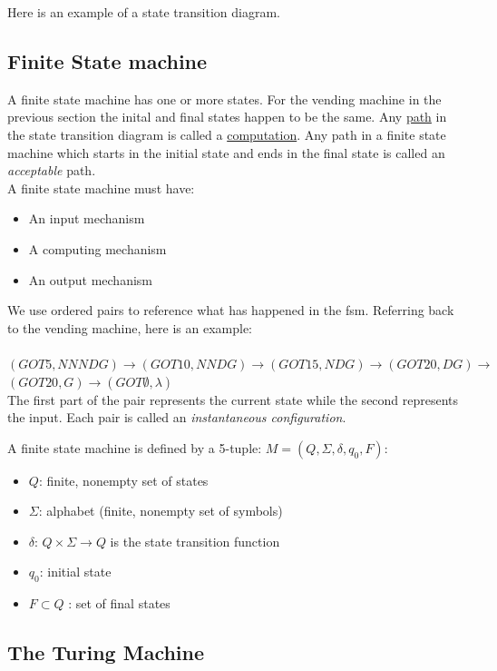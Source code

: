 \documentclass{scrartcl}
\begin{document}
Here is an example of a state transition diagram.

\subsection{Finite State machine}
A finite state machine has one or more states. For the vending machine in the previous section the inital and final states happen to be the same. Any \underline{path} in the state transition diagram is called a \underline{computation}. Any path in a finite state machine which starts in the initial state and ends in the final state is called an \emph{acceptable} path.\\

A finite state machine must have:
\begin{itemize}
\item An input mechanism
\item A computing mechanism
\item An output mechanism
\end{itemize}

We use ordered pairs to reference what has happened in the fsm. Referring back to the vending machine, here is an example:\\\\
$(GOT5,NNNDG)\rightarrow(GOT10,NNDG)\rightarrow(GOT15,NDG)\rightarrow(GOT20,DG)\rightarrow$\\
$(GOT20,G)\rightarrow(GOT\emptyset,\lambda)$\\

The first part of the pair represents the current state while the second represents the input. Each pair is called an \emph{instantaneous configuration}.

A finite state machine is defined by a 5-tuple: $M=(Q,\Sigma,\delta,q_0,F)$:
\begin{itemize}
\item $Q$: finite, nonempty set of states
\item $\Sigma$: alphabet (finite, nonempty set of symbols)
\item $\delta$: $Q\times\Sigma\rightarrow Q$ is the state transition function
\item $q_0$: initial state
\item $F\subset Q$ : set of final states
\end{itemize}

\subsection{The Turing Machine}
\end{document}
